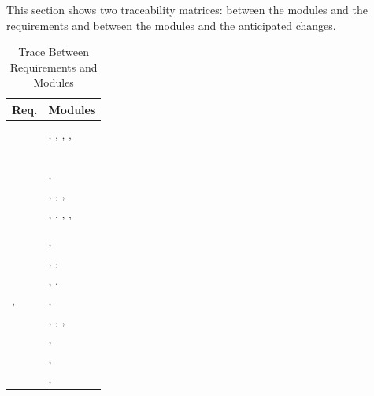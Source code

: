 \documentclass[12pt, titlepage]{article}
\begin{document}
This section shows two traceability matrices: between the modules and the requirements and between the modules and the anticipated changes.

\begin{table}[H]
\centering
\begin{tabular}{p{} p{}}
\toprule
\textbf{Req.} & \textbf{Modules}\\
\midrule
\nameref{GEN_001} & \nameref{Vision App}\\
\nameref{GEN_002} & \nameref{Vision App}, \nameref{Mapper App}, \nameref{Operations Manager}, \nameref{Message Socket}, \nameref{User Interface} \\
\nameref{GEN_003} & \nameref{Operation States}\\
\nameref{GEN_004} & \nameref{Operation States}\\
\nameref{GEN_005} & \nameref{Vision App}\\
\nameref{GEN_006} & \nameref{Vision App}\\
\nameref{STA_000}& \nameref{Operation States}\\
\nameref{STA_001}& \nameref{Operation States}, \nameref{DDC Service Interface}\\
\nameref{STA_002}& \nameref{Operation States}, \nameref{Vision App}, \nameref{Path Plan App}, \nameref{Path Plan App}\\
\nameref{STA_003}& \nameref{Operation States}, \nameref{Vision App}, 
, \nameref{Path Plan App}, \nameref{Mapper App}\\
\nameref{STA_004}& \nameref{Operation States}\\
\nameref{STA_005}& \nameref{Operation States}\\
\nameref{STA_006}& \nameref{Operation States}, \nameref{DDC Service Interface}\\
\nameref{STA_007}& \nameref{Operation States}, \nameref{Path Plan App}, \nameref{User Interface}\\
\nameref{STA_008}& \nameref{Operation States}, \nameref{Path Plan App}, \nameref{User Interface}\\
\nameref{STA_009}, \nameref{User Interface}& \nameref{Operation States}, \nameref{DDC Service Interface}\\
\nameref{STA_010}& \nameref{Operation States}, \nameref{User Interface},  \nameref{Message Socket}, \nameref{Path Plan App}\\
\nameref{STA_011}& \nameref{Operation States}, \nameref{Path Plan App}\\
\nameref{STA_012}& \nameref{Operation States}, \nameref{DDC Service Interface}\\
\nameref{STA_013}& \nameref{Operation States}, \nameref{DDC Service Interface}\\
\bottomrule
\end{tabular}
\caption{Trace Between Requirements and Modules}
\label{TblRT}
\end{table}
\end{document}
